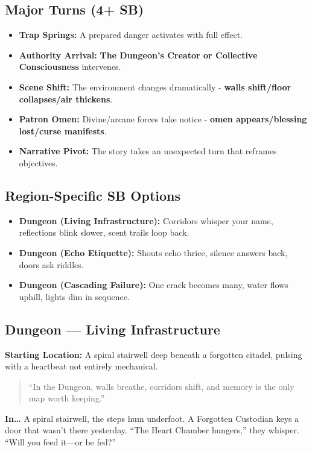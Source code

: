 \subsection*{Major Turns (4+ SB)}
\begin{itemize}
\item \textbf{Trap Springs:} A prepared danger activates with full effect.
\item \textbf{Authority Arrival:} \textbf{The Dungeon's Creator or Collective Consciousness} intervenes.
\item \textbf{Scene Shift:} The environment changes dramatically - \textbf{walls shift/floor collapses/air thickens}.
\item \textbf{Patron Omen:} Divine/arcane forces take notice - \textbf{omen appears/blessing lost/curse manifests}.
\item \textbf{Narrative Pivot:} The story takes an unexpected turn that reframes objectives.
\end{itemize}

\subsection*{Region-Specific SB Options}
\begin{itemize}
\item \textbf{Dungeon (Living Infrastructure):} Corridors whisper your name, reflections blink slower, scent trails loop back.
\item \textbf{Dungeon (Echo Etiquette):} Shouts echo thrice, silence answers back, doors ask riddles.
\item \textbf{Dungeon (Cascading Failure):} One crack becomes many, water flows uphill, lights dim in sequence.
\end{itemize}


\subsection*{Dungeon — Living Infrastructure}
\textbf{Starting Location:} A spiral stairwell deep beneath a forgotten citadel, pulsing with a heartbeat not entirely mechanical.
\begin{quote}
“In the Dungeon, walls breathe, corridors shift, and memory is the only map worth keeping.”
\end{quote}

\textbf{In…} A spiral stairwell, the steps hum underfoot. A Forgotten Custodian keys a door that wasn’t there yesterday. ``The Heart Chamber hungers,'' they whisper. ``Will you feed it—or be fed?''
